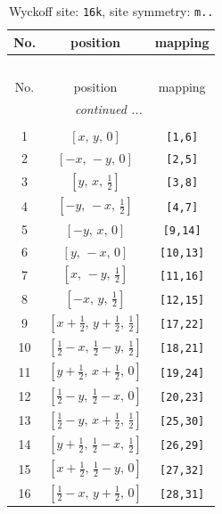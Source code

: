 \documentclass[fleqn,8pt]{jsarticle}
\begin{document}
\renewcommand{\arraystretch}{1.2}
\begin{longtable}{ccc}
\caption{Wyckoff site: {\tt 16k}, site symmetry: {\tt m..}}
 \\
 \hline \hline
No. & position & mapping \\ \hline \endfirsthead

\multicolumn{2}{l}{\tablename\ \thetable{}} \\
 \hline \hline
No. & position & mapping \\ \hline \endhead

 \hline \hline
\multicolumn{2}{r}{\footnotesize\it continued ...} \\ \endfoot

 \hline \hline
\multicolumn{2}{r}{} \\ \endlastfoot

1 & $\left[ x,\, y,\, 0 \right]$ & {\tt [1,6]} \\ \hline
2 & $\left[ - x,\, - y,\, 0 \right]$ & {\tt [2,5]} \\ \hline
3 & $\left[ y,\, x,\, \frac{1}{2} \right]$ & {\tt [3,8]} \\ \hline
4 & $\left[ - y,\, - x,\, \frac{1}{2} \right]$ & {\tt [4,7]} \\ \hline
5 & $\left[ - y,\, x,\, 0 \right]$ & {\tt [9,14]} \\ \hline
6 & $\left[ y,\, - x,\, 0 \right]$ & {\tt [10,13]} \\ \hline
7 & $\left[ x,\, - y,\, \frac{1}{2} \right]$ & {\tt [11,16]} \\ \hline
8 & $\left[ - x,\, y,\, \frac{1}{2} \right]$ & {\tt [12,15]} \\ \hline
9 & $\left[ x + \frac{1}{2},\, y + \frac{1}{2},\, \frac{1}{2} \right]$ & {\tt [17,22]} \\ \hline
10 & $\left[ \frac{1}{2} - x,\, \frac{1}{2} - y,\, \frac{1}{2} \right]$ & {\tt [18,21]} \\ \hline
11 & $\left[ y + \frac{1}{2},\, x + \frac{1}{2},\, 0 \right]$ & {\tt [19,24]} \\ \hline
12 & $\left[ \frac{1}{2} - y,\, \frac{1}{2} - x,\, 0 \right]$ & {\tt [20,23]} \\ \hline
13 & $\left[ \frac{1}{2} - y,\, x + \frac{1}{2},\, \frac{1}{2} \right]$ & {\tt [25,30]} \\ \hline
14 & $\left[ y + \frac{1}{2},\, \frac{1}{2} - x,\, \frac{1}{2} \right]$ & {\tt [26,29]} \\ \hline
15 & $\left[ x + \frac{1}{2},\, \frac{1}{2} - y,\, 0 \right]$ & {\tt [27,32]} \\ \hline
16 & $\left[ \frac{1}{2} - x,\, y + \frac{1}{2},\, 0 \right]$ & {\tt [28,31]} \\
\end{longtable}
\end{document}
